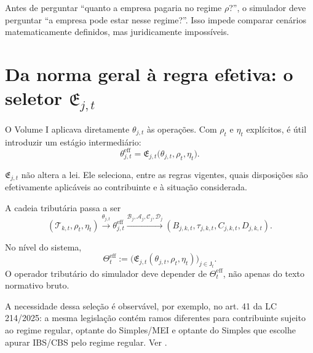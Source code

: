 \documentclass[11pt,a4paper]{article}
\newcommand{\cT}{\mathcal{T}}
\newcommand{\cB}{\mathcal{B}}
\newcommand{\cA}{\mathcal{A}}
\newcommand{\cC}{\mathcal{C}}
\newcommand{\cD}{\mathcal{D}}
\begin{document}
\begin{intuicao}
Antes de perguntar ``quanto a empresa pagaria no regime $\rho$?'', o simulador deve perguntar ``a empresa pode estar nesse regime?''. Isso impede comparar cenários matematicamente definidos, mas juridicamente impossíveis.
\end{intuicao}

\section{Da norma geral à regra efetiva: o seletor $\mathfrak E_{j,t}$}

O Volume I aplicava diretamente $\theta_{j,t}$ às operações. Com $\rho_t$ e $\eta_t$ explícitos, é útil introduzir um estágio intermediário:
\begin{equation}
\boxed{
\theta_{j,t}^{\mathrm{eff}}
=\mathfrak E_{j,t}
\bigl(\theta_{j,t},\rho_t,\eta_t\bigr).
}
\label{eq:effective-rule}
\end{equation}

$\mathfrak E_{j,t}$ não altera a lei. Ele seleciona, entre as regras vigentes, quais disposições são efetivamente aplicáveis ao contribuinte e à situação considerada.

A cadeia tributária passa a ser
\begin{equation}
(\cT_{k,t},\rho_t,\eta_t)
\xrightarrow{\theta_{j,t}}
\theta_{j,t}^{\mathrm{eff}}
\xrightarrow{\cB_j,\cA_j,\cC_j,\cD_j}
(B_{j,k,t},\tau_{j,k,t},C_{j,k,t},D_{j,k,t}).
\label{eq:pipeline-effective}
\end{equation}

\begin{formalizacao}
No nível do sistema,
\[
\Theta_t^{\mathrm{eff}}
:=\bigl(\mathfrak E_{j,t}(\theta_{j,t},\rho_t,\eta_t)\bigr)_{j\in\mathsf J_t}.
\]
O operador tributário do simulador deve depender de $\Theta_t^{\mathrm{eff}}$, não apenas do texto normativo bruto.
\end{formalizacao}

\begin{fonte}
A necessidade dessa seleção é observável, por exemplo, no art. 41 da LC 214/2025: a mesma legislação contém ramos diferentes para contribuinte sujeito ao regime regular, optante do Simples/MEI e optante do Simples que escolhe apurar IBS/CBS pelo regime regular. Ver \cite{LC214,RFB_SIMPLES_2026}.
\end{fonte}
\end{document}
